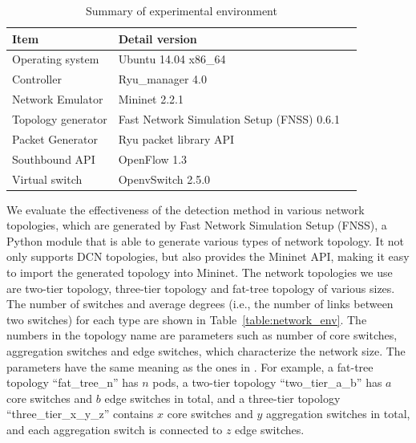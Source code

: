 \documentclass[conference]{IEEEtran}
\begin{document}
\begin{table}[ht]
\centering
\caption{Summary of experimental environment}
\begin{tabular}{|l|p{4cm}|p{4.5cm}}
\hline Item & Detail version \\
\hline
\hline Operating system & Ubuntu 14.04 x86\_64 \\
\hline Controller & Ryu\_manager 4.0 \\
\hline Network Emulator & Mininet 2.2.1 \\
\hline Topology generator & Fast Network Simulation Setup (FNSS) 0.6.1\\
\hline Packet Generator & Ryu packet library API \\
\hline Southbound API & OpenFlow 1.3 \\
\hline Virtual switch & OpenvSwitch 2.5.0 \\
\hline 
\end{tabular}
\label{table:Experiment_table}
\end{table}

We evaluate the effectiveness of the detection method in various network topologies, which are generated by Fast Network Simulation Setup (FNSS), a Python module that is able to generate various types of network topology. It not only supports DCN topologies, but also provides the Mininet API, making it easy to import the generated topology into Mininet. The network topologies we use are two-tier topology, three-tier topology and fat-tree topology of various sizes. The number of switches and average degrees (i.e., the number of links between two switches) for each type are shown in Table~\ref{table:network_env}. The numbers in the topology name are parameters such as number of core switches, aggregation switches and edge switches, which characterize the network size. The parameters have the same meaning as the ones in \cite{FNSS}. For example, a fat-tree topology ``fat\_tree\_n'' has $n$ pods, a two-tier topology ``two\_tier\_a\_b'' has $a$ core switches and $b$ edge switches in total, and a three-tier topology ``three\_tier\_x\_y\_z'' contains $x$ core switches and $y$ aggregation switches in total, and each aggregation switch is connected to $z$ edge switches. 
\end{document}
